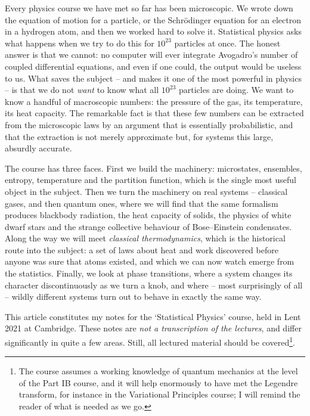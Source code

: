 



Every physics course we have met so far has been microscopic. We wrote down the equation of motion for a particle, or the Schr\"odinger equation for an electron in a hydrogen atom, and then we worked hard to solve it. Statistical physics asks what happens when we try to do this for $10^{23}$ particles at once. The honest answer is that we cannot: no computer will ever integrate Avogadro's number of coupled differential equations, and even if one could, the output would be useless to us. What saves the subject -- and makes it one of the most powerful in physics -- is that we do not \emph{want} to know what all $10^{23}$ particles are doing. We want to know a handful of macroscopic numbers: the pressure of the gas, its temperature, its heat capacity. The remarkable fact is that these few numbers can be extracted from the microscopic laws by an argument that is essentially probabilistic, and that the extraction is not merely approximate but, for systems this large, absurdly accurate.

The course has three faces. First we build the machinery: microstates, ensembles, entropy, temperature and the partition function, which is the single most useful object in the subject. Then we turn the machinery on real systems -- classical gases, and then quantum ones, where we will find that the same formalism produces blackbody radiation, the heat capacity of solids, the physics of white dwarf stars and the strange collective behaviour of Bose--Einstein condensates. Along the way we will meet \emph{classical thermodynamics}, which is the historical route into the subject: a set of laws about heat and work discovered before anyone was sure that atoms existed, and which we can now watch emerge from the statistics. Finally, we look at phase transitions, where a system changes its character discontinuously as we turn a knob, and where -- most surprisingly of all -- wildly different systems turn out to behave in exactly the same way.

This article constitutes my notes for the `Statistical Physics' course, held in Lent 2021 at Cambridge. These notes are \emph{not a transcription of the lectures}, and differ significantly in quite a few areas. Still, all lectured material should be covered\footnote{The course assumes a working knowledge of quantum mechanics at the level of the Part IB course, and it will help enormously to have met the Legendre transform, for instance in the Variational Principles course; I will remind the reader of what is needed as we go.}.



